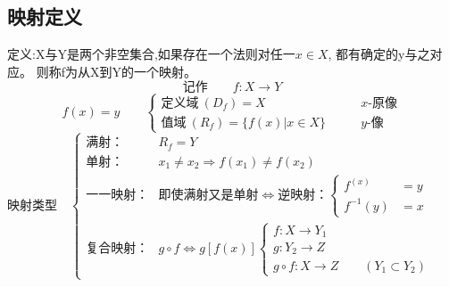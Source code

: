 \subsection{映射定义}
定义:X与Y是两个非空集合,如果存在一个法则对任一$x\in X$, 都有确定的y与之对应。
则称f为从X到Y的一个映射。
$$\mbox{记作}\qquad f:X\rightarrow Y$$
$$f(x)=y\qquad\begin{cases}
    \mbox{定义域}\ (D_f)=X &x\mbox{-原像} \\
    \mbox{值域}\ (R_f)=\{f(x)|x\in X\} \qquad&y\mbox{-像}
\end{cases}$$
映射类型$\quad
\begin{cases}
    \mbox{满射：} &R_f = Y \\
    \mbox{单射：} &x_1\neq x_2\Rightarrow f(x_1)\neq f(x_2)\\
    \mbox{一一映射：}&\mbox{即使满射又是单射}\Leftrightarrow\mbox{逆映射：}
    \begin{cases}
        f^(x)&=y\\
        f^{-1}(y)&=x
    \end{cases}\\
    \mbox{复合映射：}&g\circ f\Leftrightarrow g\left[f\left(x\right)\right]
    \begin{cases}
        f:X\rightarrow Y_1\\
        g:Y_2\rightarrow Z\\
        g\circ f:X\rightarrow Z\qquad(Y_1 \subset Y_2)
    \end{cases}
\end{cases}$